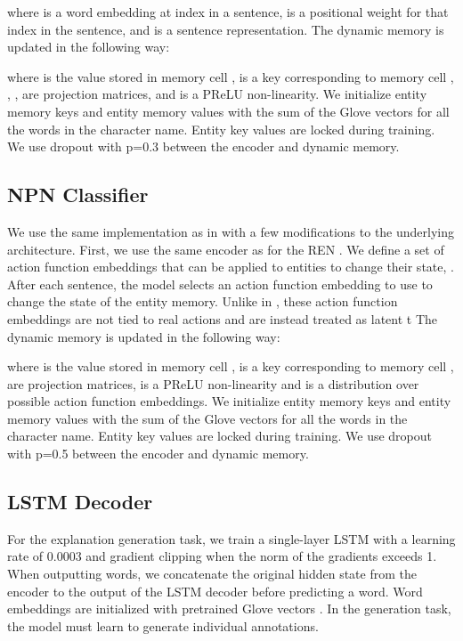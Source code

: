 \documentclass[11pt,a4paper]{article}
\begin{document}
\noindent where  is a word embedding at index  in a sentence,  is a positional weight for that index in the sentence, and  is a sentence representation. The dynamic memory is updated in the following way:



\noindent where  is the value stored in memory cell ,  is a key corresponding to memory cell , , ,  are projection matrices, and  is a PReLU non-linearity. We initialize entity memory keys and entity memory values with the sum of the Glove vectors for all the words in the character name. Entity key values  are locked during training. We use dropout with p=0.3 between the encoder and dynamic memory. 

\subsection{NPN Classifier} We use the same implementation as in \citet{Bosselut17} with a few modifications to the underlying architecture. First, we use the same encoder as for the REN \cite{ren}. We define a set of action function embeddings that can be applied to entities to change their state, . After each sentence, the model selects an action function embedding to use to change the state of the entity memory. Unlike in \citet{Bosselut17}, these action function embeddings are not tied to real actions and are instead treated as latent t  The dynamic memory is updated in the following way:



where  is the value stored in memory cell ,  is a key corresponding to memory cell ,  are projection matrices,  is a PReLU non-linearity and  is a distribution over possible action function embeddings. We initialize entity memory keys and entity memory values with the sum of the Glove vectors for all the words in the character name. Entity key values  are locked during training. We use dropout with p=0.5 between the encoder and dynamic memory.

\subsection{LSTM Decoder}

For the explanation generation task, we train a single-layer LSTM with a learning rate of 0.0003 and gradient clipping when the norm of the gradients exceeds 1. When outputting words, we concatenate the original hidden state from the encoder  to the output of the LSTM decoder before predicting a word. Word embeddings are initialized with pretrained Glove vectors \cite{pennington2014glove}. In the generation task, the model must learn to generate individual annotations. 
\end{document}
